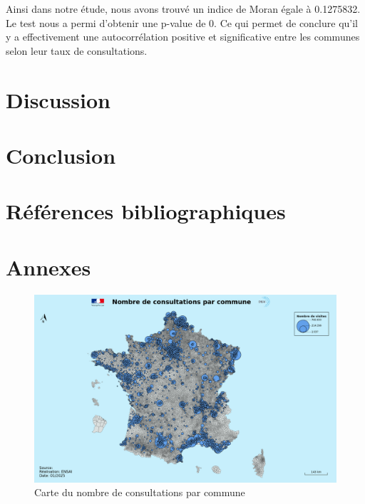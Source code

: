\documentclass[
]{article}
\begin{document}
Ainsi dans notre étude, nous avons trouvé un indice de Moran égale à
0.1275832. Le test nous a permi d'obtenir une p-value de 0. Ce qui
permet de conclure qu'il y a effectivement une autocorrélation positive
et significative entre les communes selon leur taux de consultations.

\section{Discussion}\label{discussion}

\section{Conclusion}\label{conclusion}

\section{Références
bibliographiques}\label{ruxe9fuxe9rences-bibliographiques}

\section{Annexes}\label{annexes}

\begin{figure}
    \centering
    \includegraphics[width=1\linewidth]{../cartes/nombre_de_consulatations}
    \caption{Carte du nombre de consultations par commune}
    \label{fig:figure}
\end{figure}
\end{document}
